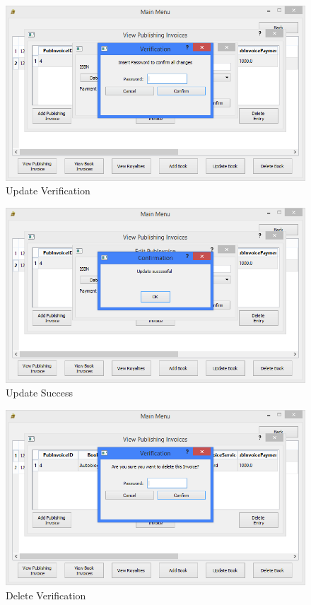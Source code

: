 \begin{figure}[H]
    \caption{Update Verification} \label{fig:UpdatePubInvoiceVerify}
    \includegraphics[width=\textwidth]{./Maintenance/UserInterface/UpdatePubInvoiceVerify.png}
\end{figure}

\begin{figure}[H]
    \caption{Update Success} \label{fig:UpdatePubInvoiceSuccess}
    \includegraphics[width=\textwidth]{./Maintenance/UserInterface/UpdatePubInvoiceSuccess.png}
\end{figure}

\begin{figure}[H]
    \caption{Delete Verification} \label{fig:DeletePubInvoice}
    \includegraphics[width=\textwidth]{./Maintenance/UserInterface/DeletePubInvoice.png}
\end{figure}

